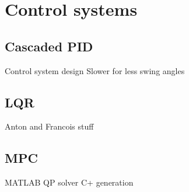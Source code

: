 \graphicspath{{control_systems/fig/}}

\chapter{Control systems}
\label{chap:control_systems}

    \section{Cascaded PID}

        Control system design
        Slower for less swing angles

    \section{LQR}

        Anton and Francois stuff

    \section{MPC}

        MATLAB
        QP solver
        C+ generation

